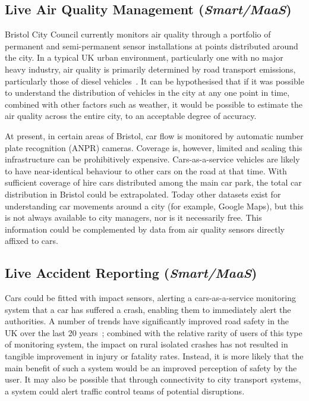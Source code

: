 \documentclass[b5paper,10pt]{article}
\begin{document}

\subsection{Live Air Quality Management ({\emph{Smart/MaaS}})}

Bristol City Council currently monitors air quality through a
portfolio of permanent and semi-permanent sensor installations at
points distributed around the city. In a typical UK urban environment,
particularly one with no major heavy industry, air quality is
primarily determined by road transport emissions, particularly those
of diesel vehicles~\citep{bbcnews:2017,glaaqd:2018}. It can be
hypothesised that if it was possible to understand the distribution of
vehicles in the city at any one point in time, combined with other
factors such as weather, it would be possible to estimate the air
quality across the entire city, to an acceptable degree of accuracy.

At present, in certain areas of Bristol, car flow is monitored by
automatic number plate recognition (ANPR) cameras. Coverage is,
however, limited and scaling this infrastructure can be prohibitively
expensive. Cars-as-a-service vehicles are likely to have
near-identical behaviour to other cars on the road at that time. With
sufficient coverage of hire cars distributed among the main car park,
the total car distribution in Bristol could be extrapolated. Today
other datasets exist for understanding car movements around a city
(for example, Google Maps), but this is not always available to city
managers, nor is it necessarily free. This information could be
complemented by data from air quality sensors directly affixed to
cars.



\subsection{Live Accident Reporting ({\emph{Smart/MaaS}})}

Cars could be fitted with impact sensors, alerting a cars-as-a-service
monitoring system that a car has suffered a crash, enabling them to
immediately alert the authorities. A number of trends have
significantly improved road safety in the UK over the last 20
years~\citep{dftsafetystats:2018}; combined with the relative rarity
of users of this type of monitoring system, the impact on rural
isolated crashes has not resulted in tangible improvement in injury or
fatality rates. Instead, it is more likely that the main benefit of
such a system would be an improved perception of safety by the
user. It may also be possible that through connectivity to city
transport systems, a system could alert traffic control teams of
potential disruptions.
\end{document}
